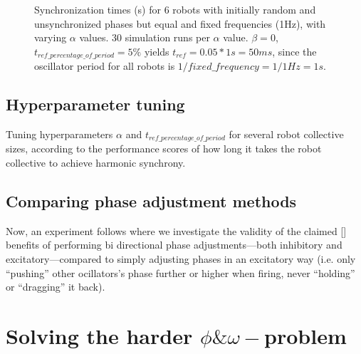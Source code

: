 	
	\begin{figure}[ht!]
		\centering
		\caption{Synchronization times (s) for 6 robots with initially random and unsynchronized phases but equal and fixed frequencies (1Hz), with varying $\alpha$ values. 30 simulation runs per $\alpha$ value. $\beta=0$, $t_{ref\_percentage\_of\_period} = 5\%$ yields $t_{ref}=0.05*1s=50ms$, since the oscillator period for all robots is $1/fixed\_frequency=1/1Hz=1s$.}
	\end{figure}
	
	
	
	\subsection{Hyperparameter tuning}
	Tuning hyperparameters $\alpha$ and $t_{ref\_percentage\_of\_period}$ for several robot collective sizes, according to the performance scores of how long it takes the robot collective to achieve harmonic synchrony.
	
	\subsection{Comparing phase adjustment methods}
	Now, an experiment follows where we investigate the validity of the claimed [] benefits of performing bi directional phase adjustments—both inhibitory and excitatory—compared to simply adjusting phases in an excitatory way (i.e. only ``pushing'' other ocillators's phase further or higher when firing, never ``holding'' or ``dragging'' it back).
	
	
	
	
	
	
	\section{Solving the harder $\phi\&\omega-$problem}
	
